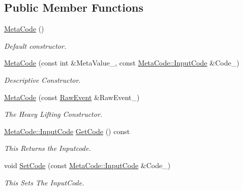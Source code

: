 \subsection*{Public Member Functions}
\begin{DoxyCompactItemize}
\item 
\hyperlink{classphys_1_1MetaCode_ae2c80c84f924ddfd880f46ffe6a1746e}{MetaCode} ()
\begin{DoxyCompactList}\small\item\em Default constructor. \item\end{DoxyCompactList}\item 
\hyperlink{classphys_1_1MetaCode_a590e6b767952e278b72ff71eddf369d4}{MetaCode} (const int \&MetaValue\_\-, const \hyperlink{classphys_1_1MetaCode_a3e501cbb5bf0f6f1fdb7211465bda8d8}{MetaCode::InputCode} \&Code\_\-)
\begin{DoxyCompactList}\small\item\em Descriptive Constructor. \item\end{DoxyCompactList}\item 
\hyperlink{classphys_1_1MetaCode_ad9a618b5cc6f9d0cf0a4bc4f47bf98e8}{MetaCode} (const \hyperlink{namespacephys_a8126d26e4507e66d09876988bb941fd4}{RawEvent} \&RawEvent\_\-)
\begin{DoxyCompactList}\small\item\em The Heavy Lifting Constructor. \item\end{DoxyCompactList}\item 
\hyperlink{classphys_1_1MetaCode_a3e501cbb5bf0f6f1fdb7211465bda8d8}{MetaCode::InputCode} \hyperlink{classphys_1_1MetaCode_a5835a05391cbb5a3dc83534a7bcf87d3}{GetCode} () const 
\begin{DoxyCompactList}\small\item\em This Returns the Inputcode. \item\end{DoxyCompactList}\item 
void \hyperlink{classphys_1_1MetaCode_ab6759fbee9d039cf248bf76dde0f33dd}{SetCode} (const \hyperlink{classphys_1_1MetaCode_a3e501cbb5bf0f6f1fdb7211465bda8d8}{MetaCode::InputCode} \&Code\_\-)
\begin{DoxyCompactList}\small\item\em This Sets The InputCode. \item\end{DoxyCompactList}\item 

\end{DoxyCompactItemize}

